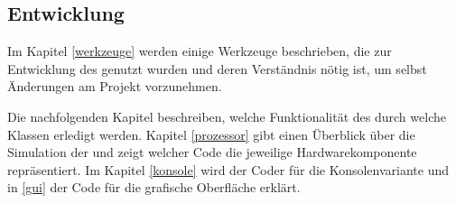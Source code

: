 \subsection*{Entwicklung}
Im Kapitel \ref{werkzeuge} werden einige Werkzeuge beschrieben, die zur Entwicklung des \md{} genutzt wurden und deren Verständnis nötig ist, um selbst Änderungen am Projekt vorzunehmen.

Die nachfolgenden Kapitel beschreiben, welche Funktionalität des \md{} durch welche Klassen erledigt werden. Kapitel \ref{prozessor} gibt einen Überblick über die Simulation der \mic{} und zeigt welcher Code die jeweilige Hardwarekomponente repräsentiert. Im Kapitel \ref{konsole} wird der Coder für die Konsolenvariante und in \ref{gui} der Code für die grafische Oberfläche erklärt.